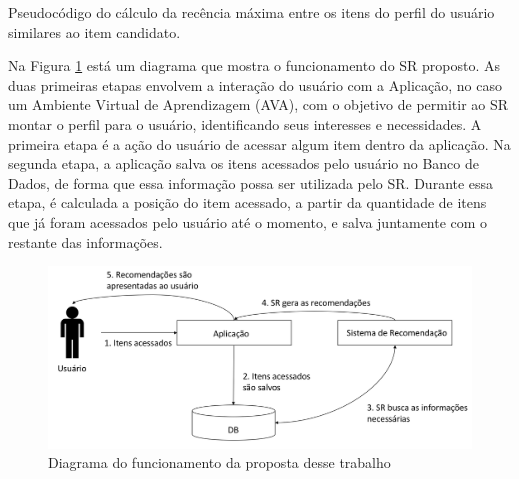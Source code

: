 \begin{algorithm}
  \caption{Pseudocódigo do cálculo da recência máxima entre os itens do perfil do usuário similares ao item candidato. \label{alg:max-recencia-pseudocodigo}}


\end{algorithm}

Na Figura \ref{fig:modelo-proposta} está um diagrama que mostra o funcionamento do SR proposto. As duas primeiras etapas envolvem
a interação do usuário com a Aplicação, no caso um Ambiente Virtual de Aprendizagem (AVA), com o objetivo de permitir ao
SR montar o perfil para o usuário, identificando seus interesses e necessidades. A primeira etapa é a ação do usuário de
acessar algum item dentro da aplicação. Na segunda etapa, a aplicação salva os itens acessados pelo usuário no
Banco de Dados, de forma que essa informação possa ser utilizada pelo SR. Durante essa etapa, é calculada a posição do
item acessado, a partir da quantidade de itens que já foram acessados pelo usuário até o momento, e salva juntamente
com o restante das informações.

\begin{figure}[htb]
  \caption{\label{fig:modelo-proposta}Diagrama do funcionamento da proposta desse trabalho}
  \begin{center}
      \includegraphics[scale=0.4]{./Figuras/modelo-proposta.png}
  \end{center}
\end{figure}


